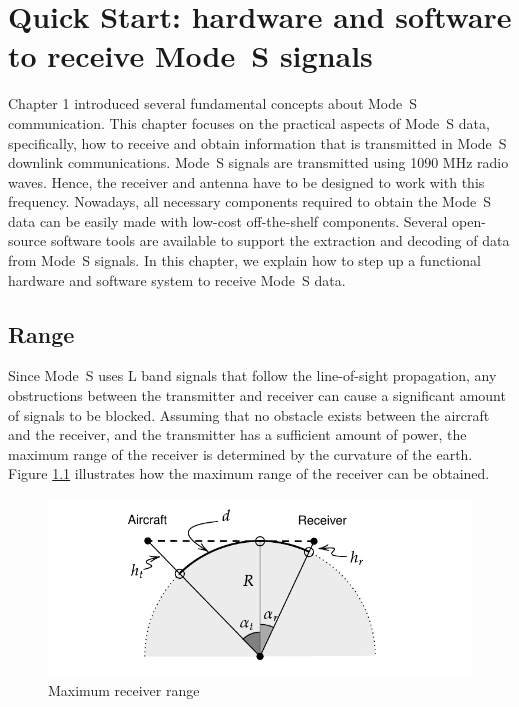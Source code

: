 \chapter{Quick Start: hardware and software to receive Mode~S signals}
\label{chap:quickstart}

Chapter 1 introduced several fundamental concepts about Mode~S communication. This chapter focuses on the practical aspects of Mode~S data, specifically, how to receive and obtain information that is transmitted in Mode~S downlink communications. Mode~S signals are transmitted using 1090 MHz radio waves. Hence, the receiver and antenna have to be designed to work with this frequency. Nowadays, all necessary components required to obtain the Mode~S data can be easily made with low-cost off-the-shelf components. Several open-source software tools are available to support the extraction and decoding of data from Mode~S signals. In this chapter, we explain how to step up a functional hardware and software system to receive Mode~S data.

\section{Range}
Since Mode~S uses L band signals that follow the line-of-sight propagation, any obstructions between the transmitter and receiver can cause a significant amount of signals to be blocked. Assuming that no obstacle exists between the aircraft and the receiver, and the transmitter has a sufficient amount of power, the maximum range of the receiver is determined by the curvature of the earth. Figure \ref{fig:max_range} illustrates how the maximum range of the receiver can be obtained.

\begin{figure}[ht]
\centering
\includegraphics[scale=0.9]{figures/quickstart/max_range.pdf}
\caption{Maximum receiver range}
\label{fig:max_range}
\end{figure}


